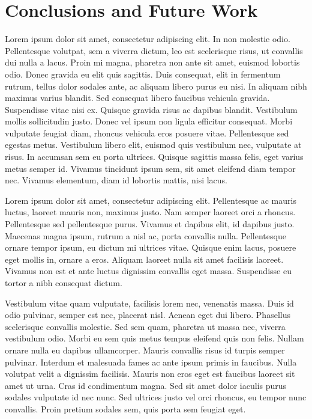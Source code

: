 \documentclass[12pt]{report}
\begin{document}
\chapter{Conclusions and Future Work}
Lorem ipsum dolor sit amet, consectetur adipiscing elit. In non molestie odio. Pellentesque volutpat, sem a viverra dictum, leo est scelerisque risus, ut convallis dui nulla a lacus. Proin mi magna, pharetra non ante sit amet, euismod lobortis odio. Donec gravida eu elit quis sagittis. Duis consequat, elit in fermentum rutrum, tellus dolor sodales ante, ac aliquam libero purus eu nisi. In aliquam nibh maximus varius blandit. Sed consequat libero faucibus vehicula gravida. Suspendisse vitae nisi ex. Quisque gravida risus ac dapibus blandit. Vestibulum mollis sollicitudin justo. Donec vel ipsum \cite{berard1994embedding} non ligula efficitur consequat. Morbi vulputate feugiat diam, rhoncus vehicula eros posuere vitae. Pellentesque sed egestas metus. Vestibulum libero elit, euismod quis vestibulum nec, vulputate at risus. In accumsan sem eu porta ultrices. Quisque sagittis massa felis, eget varius metus semper id. Vivamus tincidunt ipsum sem, sit amet eleifend diam tempor nec. Vivamus elementum, diam id lobortis mattis, nisi lacus.

Lorem ipsum dolor sit amet, consectetur adipiscing elit. Pellentesque ac mauris luctus, laoreet mauris non, maximus justo. Nam semper laoreet orci a rhoncus. Pellentesque sed pellentesque purus. Vivamus et dapibus elit, id dapibus justo. Maecenas magna ipsum, rutrum a nisl ac, porta convallis nulla. Pellentesque ornare tempor ipsum, eu dictum mi ultrices vitae. Quisque enim lacus, posuere eget mollis in, ornare a eros. Aliquam laoreet nulla sit amet facilisis laoreet. Vivamus non est et ante luctus dignissim convallis eget massa. Suspendisse eu tortor a nibh consequat dictum.

Vestibulum vitae quam vulputate, facilisis lorem nec, venenatis massa. Duis id odio pulvinar, semper est nec, placerat nisl. Aenean eget dui libero. Phasellus scelerisque convallis molestie. Sed sem quam, pharetra ut massa nec, viverra vestibulum odio. Morbi eu sem quis metus tempus eleifend quis non felis. Nullam ornare nulla eu dapibus ullamcorper. Mauris convallis risus id turpis semper pulvinar. Interdum et malesuada fames ac ante ipsum primis in faucibus. Nulla volutpat velit a dignissim facilisis. Mauris non eros eget est faucibus laoreet sit amet ut urna. Cras id condimentum magna. Sed sit amet dolor iaculis purus sodales vulputate id nec nunc. Sed ultrices justo vel orci rhoncus, eu tempor nunc convallis. Proin pretium sodales sem, quis porta sem feugiat eget.
\end{document}
